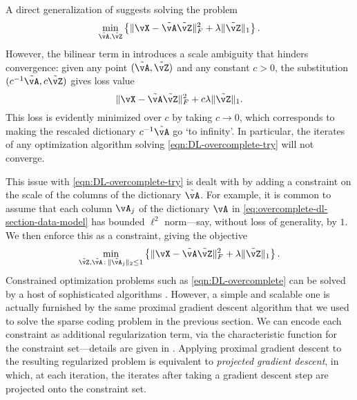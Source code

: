 \documentclass[../../book-main.tex]{subfiles}
\begin{document}
A direct generalization of  suggests solving the problem
\begin{equation}
    \min_{\tilde{\vA}, \tilde{\vZ}}\bc{\norm{\vX - \tilde{\vA}\tilde{\vZ}}_{F}^{2} + \lambda \norm{\tilde{\vZ}}_{1}}.
    \label{eqn:DL-overcomplete-try}
\end{equation}
However, the bilinear term in  introduces a scale
ambiguity that hinders convergence: given any point $(\tilde{\vA},
\tilde{\vZ})$ and any constant $c>0$, the substitution
$(c^{-1}\tilde{\vA}, c\tilde{\vZ})$ gives loss value
\begin{equation}
    \norm{\vX - \tilde{\vA}\tilde{\vZ}}_{F}^{2} + c\lambda \norm{\tilde{\vZ}}_{1}.
\end{equation}
This loss is evidently minimized over $c$ by taking $c \to 0$, which corresponds
to making the rescaled dictionary $c^{-1} \tilde{\vA}$ go `to infinity'. In
particular, the iterates of any optimization algorithm solving
\eqref{eqn:DL-overcomplete-try} will not converge.

This issue with \eqref{eqn:DL-overcomplete-try} is dealt with by adding
a constraint on the scale of the columns of the dictionary $\tilde{\vA}$.
For example, it is common to assume that each column $\vA_j$ of the dictionary
$\vA$ in \eqref{eq:overcomplete-dl-section-data-model} has bounded $\ell^2$
norm---say, without loss of generality, by $1$.
We then enforce this as a constraint, giving the objective
\begin{equation}
    \min_{\tilde{\vZ}, \tilde{\vA} \,:\, \norm{\tilde{\vA}_j}_2 \leq 1}
    \bc{\norm{\vX - \tilde{\vA}\tilde{\vZ}}_{F}^{2} + \lambda \norm{\tilde{\vZ}}_{1}}.
    \label{eqn:DL-overcomplete}
\end{equation}
Constrained optimization problems such as \eqref{eqn:DL-overcomplete}
can be solved by a host of sophisticated algorithms
\cite{nocedal2006numerical}. However, a simple and scalable one is actually
furnished by the same proximal gradient descent algorithm that we used to solve
the sparse coding problem in the previous section.
We can encode each constraint as additional regularization term, via the
characteristic function for the constraint set---details are given in
.
Applying proximal gradient descent to the resulting regularized problem is
equivalent to \textit{projected gradient descent}, in which, at each iteration,
the iterates after taking a gradient descent step are projected onto the
constraint set.
\end{document}
